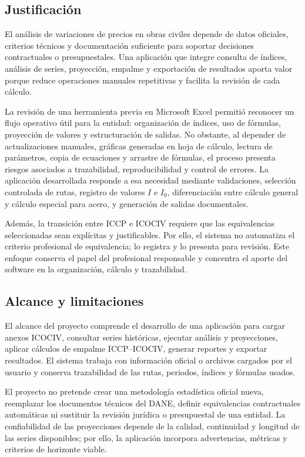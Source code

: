 \documentclass[12pt,letterpaper]{article}
\newcommand{\ICOCIV}{ICOCIV}
\newcommand{\ICCP}{ICCP}
\newcommand{\DANE}{DANE}
\begin{document}
\subsection{Justificación}

El análisis de variaciones de precios en obras civiles depende de datos oficiales, criterios técnicos y documentación suficiente para soportar decisiones contractuales o presupuestales. Una aplicación que integre consulta de índices, análisis de series, proyección, empalme y exportación de resultados aporta valor porque reduce operaciones manuales repetitivas y facilita la revisión de cada cálculo.

La revisión de una herramienta previa en Microsoft Excel permitió reconocer un flujo operativo útil para la entidad: organización de índices, uso de fórmulas, proyección de valores y estructuración de salidas. No obstante, al depender de actualizaciones manuales, gráficas generadas en hoja de cálculo, lectura de parámetros, copia de ecuaciones y arrastre de fórmulas, el proceso presenta riesgos asociados a trazabilidad, reproducibilidad y control de errores. La aplicación desarrollada responde a esa necesidad mediante validaciones, selección controlada de rutas, registro de valores \(I\) e \(I_0\), diferenciación entre cálculo general y cálculo especial para acero, y generación de salidas documentales.

Además, la transición entre \ICCP{} e \ICOCIV{} requiere que las equivalencias seleccionadas sean explícitas y justificables. Por ello, el sistema no automatiza el criterio profesional de equivalencia; lo registra y lo presenta para revisión. Este enfoque conserva el papel del profesional responsable y concentra el aporte del software en la organización, cálculo y trazabilidad.

\subsection{Alcance y limitaciones}

El alcance del proyecto comprende el desarrollo de una aplicación para cargar anexos \ICOCIV, consultar series históricas, ejecutar análisis y proyecciones, aplicar cálculos de empalme \ICCP--\ICOCIV, generar reportes y exportar resultados. El sistema trabaja con información oficial o archivos cargados por el usuario y conserva trazabilidad de las rutas, periodos, índices y fórmulas usados.

El proyecto no pretende crear una metodología estadística oficial nueva, reemplazar los documentos técnicos del \DANE, definir equivalencias contractuales automáticas ni sustituir la revisión jurídica o presupuestal de una entidad. La confiabilidad de las proyecciones depende de la calidad, continuidad y longitud de las series disponibles; por ello, la aplicación incorpora advertencias, métricas y criterios de horizonte viable.
\end{document}

